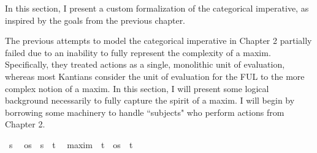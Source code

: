 %
\begin{isabellebody}%
%
%
\isadelimtheory
%
\endisadelimtheory
%
\isatagtheory
%
\endisatagtheory
{\isafoldtheory}%
%
\isadelimtheory
%
\endisadelimtheory
%
\isadelimdocument
%
\endisadelimdocument
%
\isatagdocument
%
\isamarkuptrue%
%
\endisatagdocument
{\isafolddocument}%
%
\isadelimdocument
%
\endisadelimdocument
%
\begin{isamarkuptext}%
In this section, I present a custom formalization of the categorical imperative, as inspired by 
the goals from the previous chapter.%
\end{isamarkuptext}\isamarkuptrue%
%
\isadelimdocument
%
\endisadelimdocument
%
\isatagdocument
%
\isamarkuptrue%
%
\endisatagdocument
{\isafolddocument}%
%
\isadelimdocument
%
\endisadelimdocument
%
\begin{isamarkuptext}%
The previous attempts to model the categorical imperative in Chapter 2 partially failed due to 
an inability to fully represent the complexity of a maxim. Specifically, they treated actions as a single, 
monolithic unit of evaluation, whereas most Kantians consider the unit of evaluation for the FUL to the more
complex notion of a maxim. In this section, I will present some logical background necessarily to fully 
capture the spirit of a maxim. I will begin by borrowing some machinery to handle ``subjects" who perform 
actions from Chapter 2.%
\end{isamarkuptext}\isamarkuptrue%
\isamarkupfalse%
\ s\ %
\isanewline
\isanewline
{}\isamarkupfalse%
\ os\ {\isacharequal}\ {\isachardoublequoteopen}{\isacharparenleft}s\ {\isasymRightarrow}\ t{\isacharparenright}{\isachardoublequoteclose}\ %
\isanewline
\isanewline
{}\isamarkupfalse%
\ maxim\ {\isacharequal}\ {\isachardoublequoteopen}{\isacharparenleft}t\ {\isacharasterisk}\ os\ {\isacharasterisk}\ t{\isacharparenright}{\isachardoublequoteclose}%

\end{isabellebody}
